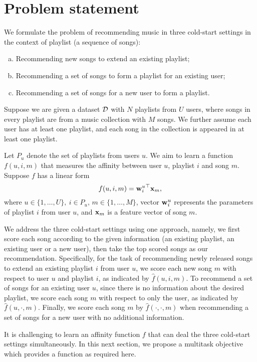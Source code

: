 \section{Problem statement}
\label{sec:problem}

We formulate the problem of recommending music in three cold-start settings in the context of 
playlist (\ie a sequence of songs):
\begin{enumerate}[(a)]
\item Recommending new songs to extend an existing playlist;
\item Recommending a set of songs to form a playlist for an existing user;
\item Recommending a set of songs for a new user to form a playlist.
\end{enumerate}

Suppose we are given a dataset $\mathcal{D}$ with $N$ playlists from $U$ users, 
where songs in every playlist are from a music collection with $M$ songs.
We further assume each user has at least one playlist, and each song in the collection 
is appeared in at least one playlist.

Let $P_u$ denote the set of playlists from users $u$.
We aim to learn a function $f(u, i, m)$ that measures the affinity between user $u$, 
playlist $i$ and song $m$. Suppose $f$ has a linear form
\begin{equation}
\label{eq:scorefunc}
f(u, i, m) = {\mathbf{w}_i^u}^\top \mathbf{x}_m,
\end{equation}
where $u \in \{1,\dots,U\}, \ i \in P_u, \, m \in \{1,\dots,M\}$,
vector $\mathbf{w}_i^u$ represents the parameters of playlist $i$ from user $u$,
and $\mathbf{x}_m$ is a feature vector of song $m$.

We address the three cold-start settings using one approach, namely, we first score each song 
according to the given information (\eg an existing playlist, an existing user or a new user),
then take the top scored songs as our recommendation.
Specifically, for the task of recommending newly released songs to extend an existing playlist $i$ from user $u$,
we score each new song $m$ with respect to user $u$ and playlist $i$, as indicated by $\hat f(u, i, m)$.
To recommend a set of songs for an existing user $u$,
since there is no information about the desired playlist, we score each song $m$ with respect to only the user,
as indicated by $\hat f(u, \cdot, m)$.
Finally, we score each song $m$ by $\hat f(\cdot, \cdot, m)$ when recommending a set of songs 
for a new user with no additional information.

It is challenging to learn an affinity function $f$ that can deal the three cold-start settings simultaneously.
In this next section, we propose a multitask objective which provides a function as required here.
